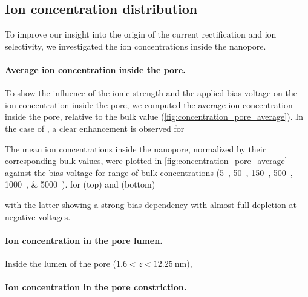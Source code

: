 \documentclass[journal=ancac3, manuscript=article, etalmode=truncate,maxauthors=0]{achemso}
\begin{document}
\subsection{Ion concentration distribution}
To improve our insight into the origin of the current rectification and ion selectivity, we investigated the ion concentrations inside the nanopore.

\paragraph{Average ion concentration inside the pore.}
To show the influence of the ionic strength and the applied bias voltage on the ion concentration inside the pore,
we computed the average ion concentration inside the pore, relative to the bulk value (\cref{fig:concentration_pore_average}).
In the case of , a clear enhancement is observed for

The mean ion concentrations inside the nanopore, normalized by their corresponding bulk values, were plotted in \cref{fig:concentration_pore_average} against the bias voltage for range of bulk concentrations (\SIlist{5;50;150;500;1000;5000}{\mM}).
for  (top) and  (bottom)





with the latter showing a strong bias dependency
with almost full depletion at negative voltages.
\paragraph{Ion concentration in the pore lumen.}
Inside the lumen of the pore ($1.6<z<\SI{12.25}{\nm}$),
\paragraph{Ion concentration in the pore constriction.}




%
\end{document}
